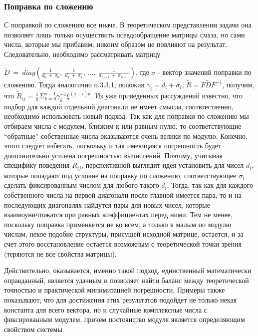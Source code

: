 \documentclass[a4paper]{article}
\theoremstyle{definition}
\begin{document}
    \subsubsection{Поправка по сложению}


    С поправкой по сложению все иначе. В теоретическом представлении задачи она позволяет лишь только осуществить псевдообращение матрицы смаза, но сами числа, которые мы прибавим, никоим образом не повлияют на результат. Следовательно, необходимо рассматривать матрицу

$\tilde{D}~=~diag(\frac{1}{d_0~+~\sigma_0},~\frac{1}{d_1~+~\sigma_1},~...,~\frac{1}{d_{n-1}~+~\sigma_{n-1}})$, где $\sigma$ - вектор значений поправки по сложению. Тогда аналогично п.3.3.1, положив $\gamma_i = d_i + \sigma_i$, $\tilde{R} = F\tilde{D}F^{-1}$, получим, что $\tilde{R}_{ij} = \frac{1}{n}\Sigma_{k=0}^{n-1} \gamma_k^{-1} \xi^{(j-i)k}$. Из уже приведенных рассуждений известно, что подбор для каждой отдельной диагонали не имеет смысла, соотвтественно, необходимо использовать новый подход. Так как для поправки по сложению мы отбираем числа с модулем, близким к или равным нулю, то соответствующие ``обратные'' собственные числа оказываются очень велики по модулю. Конечно, этого следует избегать, поскольку и так имеющаяся погрешность будет дополнительно усилена погрешностью вычислений. Поэтому, учитывая специфику поведения $R_{ij}$, перспективной выглядит идея установить для чисел $d_i$, которые попадают под условие на поправку по сложению, соответствующее $\sigma_i$ сделать фиксированным числом для любого такого $d_i$. Тогда, так как для каждого собственного числа на первой диагонали после главной имеется пара, то и на последующих диагоналях найдутся пары для новых чисел, которые взаимоуничтожатся при равных коэффициентах перед ними.  Тем не менее, поскольку поправка применяется не ко всем, а только к малым по модулю числам, некое подобие структуры, присущей исходной матрице, остается, и за счет этого восстановление остается возможным с теоретической точки зрения (теряются не все свойства матрицы).


    Действительно, оказывается, именно такой подход, единственный математически оправданный, является удачным и позволяет найти баланс между теоретической точностью и практической минимизацией погрешности. Примеры также показывают, что для достижения этих результатов подойдет не только некая константа для всего вектора, но и случайные комплексные числа с фиксированным модулем, причем постоянство модуля является определяющим свойством системы.
\end{document}
